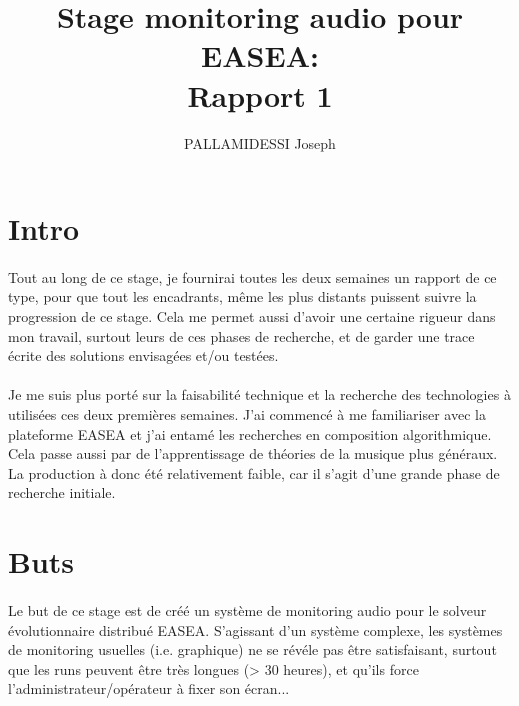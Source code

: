 \documentclass{article}
\begin{document}
  \title{Stage monitoring audio pour EASEA: \\
    \large Rapport 1}
  \author{PALLAMIDESSI Joseph}
  \maketitle

  \section{Intro} %
  \label{sec:Intro}
    \paragraph{} %
    \label{par:} 
      Tout au long de ce stage, je fournirai toutes les deux semaines un rapport de ce
      type, pour que tout les encadrants, même les plus distants puissent suivre la
      progression de ce stage. Cela me permet aussi d'avoir une certaine rigueur dans
      mon travail, surtout leurs de ces phases de recherche, et de garder une trace
      écrite des solutions envisagées et/ou testées.
    
    \paragraph{} %
    \label{par:}
      Je me suis plus porté sur la faisabilité technique et la recherche des
      technologies à utilisées ces deux premières semaines. J'ai commencé à me
      familiariser avec la plateforme EASEA et j'ai entamé les recherches en
      composition algorithmique. Cela passe aussi par de l'apprentissage de théories
      de la musique plus généraux.
      La production à donc été relativement faible, car il s'agit d'une grande phase de
      recherche initiale.
    

  \section{Buts} %
  \label{sec:But}
    \paragraph{} %
    \label{par:}
      Le but de ce stage est de créé un système de monitoring audio pour le solveur
      évolutionnaire distribué EASEA. S'agissant d'un système complexe, les systèmes de
      monitoring usuelles (i.e. graphique) ne se révéle pas être satisfaisant, surtout
      que les runs peuvent être très longues (> 30 heures), et qu'ils force
      l'administrateur/opérateur à fixer son écran... 
\end{document}
